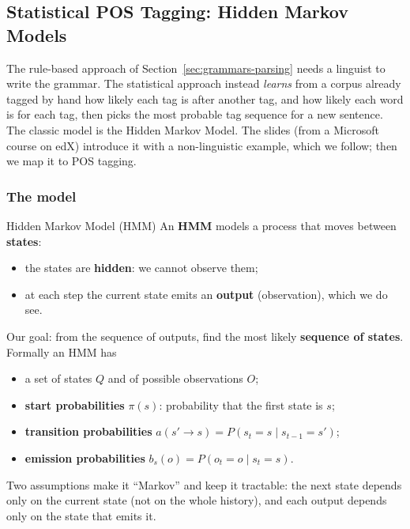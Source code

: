 \subsection{Statistical POS Tagging: Hidden Markov Models}
\label{sec:hmm-pos-tagging}

The rule-based approach of Section~\ref{sec:grammars-parsing} needs a linguist to write
the grammar. The statistical approach instead \emph{learns} from a corpus already tagged
by hand how likely each tag is after another tag, and how likely each word is for each
tag, then picks the most probable tag sequence for a new sentence. The classic model is
the Hidden Markov Model. The slides (from a Microsoft course on edX) introduce it with a
non-linguistic example, which we follow; then we map it to POS tagging.

\subsubsection{The model}

\begin{nbdef}{Hidden Markov Model (HMM)}
An \textbf{HMM} models a process that moves between \textbf{states}:
\begin{itemize}[nosep]
  \item the states are \textbf{hidden}: we cannot observe them;
  \item at each step the current state emits an \textbf{output} (observation), which we
        do see.
\end{itemize}
Our goal: from the sequence of outputs, find the most likely \textbf{sequence of
states}. Formally an HMM has
\begin{itemize}[nosep]
  \item a set of states $Q$ and of possible observations $O$;
  \item \textbf{start probabilities} $\pi(s)$: probability that the first state is $s$;
  \item \textbf{transition probabilities} $a(s' \to s) = P(s_t = s \mid s_{t-1} = s')$;
  \item \textbf{emission probabilities} $b_s(o) = P(o_t = o \mid s_t = s)$.
\end{itemize}
\end{nbdef}

Two assumptions make it ``Markov'' and keep it tractable: the next state depends only on
the current state (not on the whole history), and each output depends only on the state
that emits it.

